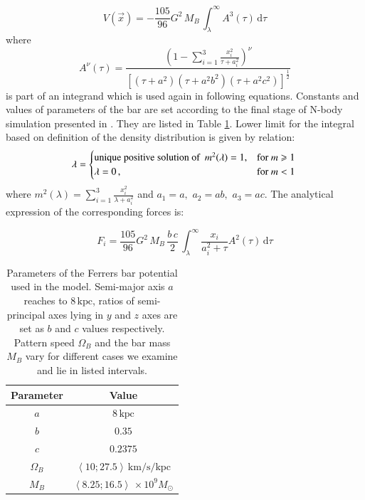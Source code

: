 \documentclass[a4paper,fleqn,usenatbib]{mnras}
\begin{document}
\begin{equation}
	V(\vec{x}) = -\frac{105}{96}G^2\,M_B\,\int_{\lambda}^{\infty} A^{3}(\tau)\,\mathrm{d} \tau
\end{equation}
where
\begin{equation}
	A^{\nu}(\tau) = \frac{\left(1- \sum_{i=1}^{3} \frac{x_i^2}{\tau + a_i^2}\right)^{\nu}}{[(\tau + a^2)(\tau + a^2b^2)(\tau + a^2c^2)]^\frac{1}{2}}
\end{equation}
is part of an integrand which is used again in following equations. Constants and values of parameters of the bar are set according to the final stage of N-body simulation presented in \cite{MachadoManos:2016}. They are listed in Table \ref{tab:potential_params)}. Lower limit for the integral based on definition of the density distribution is given by relation:
\begin{equation}
	\lambda = \begin{cases}
	\text{unique positive solution of} \,\,\, m^2(\lambda)=1, &  \text{for}\ m \geq 1\\
	\lambda = 0\,, & \text{for}\ m < 1
	\end{cases} \\
\end{equation}
where $ m^2(\lambda) = \sum_{i=1}^{3} \frac{x_i^2}{\lambda + a_i^2} $ and $ a_1 = a,\,\,a_2 = ab,\,\,a_3 = ac $.	
The analytical expression of the corresponding
forces is:

\begin{equation}
	F_i = \frac{105}{96}G^2\,M_B\,\frac{b\,c}{2}\, \int_{\lambda}^{\infty} \frac{x_i}{a_i^2 + \tau} A^{2}(\tau)\,\mathrm{d} \tau
\end{equation}  


\begin{table}
	\centering
	\caption{Parameters of the Ferrers bar potential used in the model. Semi-major axis $a$ reaches to $ 8\,\mathrm{kpc} $, ratios of semi-principal axes lying in $y$ and $z$ axes are set as $b$ and $c$ values respectively. Pattern speed $\Omega_B$ and the bar mass $M_B$ vary for different cases we examine and lie in listed intervals.}
	\label{tab:potential_params)}
	\begin{tabular}{cc} %
		\hline
		Parameter & Value \\
		\hline
		$ a $ & $8\,\mathrm{kpc}$\\
		$ b $ & $ 0.35 $\\
		$ c $ & $ 0.2375 $\\
		$ \Omega_B $ & $ \left< 10;27.5\right>\,\mathrm{km/s/kpc} $\\
		$ M_{B} $ & $ \left<8.25;16.5\right>\, \times 10^{9} M_{\odot}$\\
		\hline
	\end{tabular}
\end{table}
\end{document}
